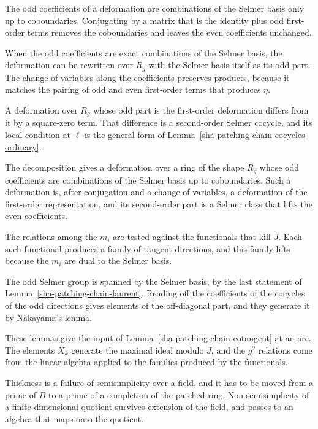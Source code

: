 The odd coefficients of a deformation are combinations of the Selmer basis only up to coboundaries. Conjugating by a matrix that is the identity plus odd first-order terms removes the coboundaries and leaves the even coefficients unchanged.

When the odd coefficients are exact combinations of the Selmer basis, the deformation can be rewritten over $R_g$ with the Selmer basis itself as its odd part. The change of variables along the coefficients preserves products, because it matches the pairing of odd and even first-order terms that produces $\eta$.

A deformation over $R_g$ whose odd part is the first-order deformation differs from it by a square-zero term. That difference is a second-order Selmer cocycle, and its local condition at $\ell$ is the general form of Lemma~\ref{sha-patching-chain-cocycles-ordinary}.

The decomposition gives a deformation over a ring of the shape $R_g$ whose odd coefficients are combinations of the Selmer basis up to coboundaries. Such a deformation is, after conjugation and a change of variables, a deformation of the first-order representation, and its second-order part is a Selmer class that lifts the even coefficients.

The relations among the $m_i$ are tested against the functionals that kill $J$. Each such functional produces a family of tangent directions, and this family lifts because the $m_i$ are dual to the Selmer basis.

The odd Selmer group is spanned by the Selmer basis, by the last statement of Lemma~\ref{sha-patching-chain-laurent}. Reading off the coefficients of the cocycles of the odd directions gives elements of the off-diagonal part, and they generate it by Nakayama's lemma.

These lemmas give the input of Lemma~\ref{sha-patching-chain-cotangent} at an arc. The elements $X_k$ generate the maximal ideal modulo $J$, and the $g^2$ relations come from the linear algebra applied to the families produced by the functionals.

Thickness is a failure of semisimplicity over a field, and it has to be moved from a prime of $B$ to a prime of a completion of the patched ring. Non-semisimplicity of a finite-dimensional quotient survives extension of the field, and passes to an algebra that maps onto the quotient.

